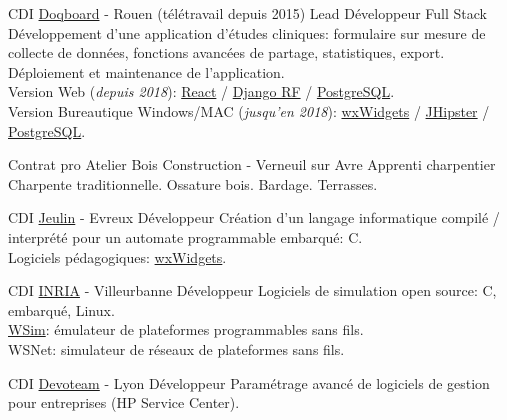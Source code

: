 \documentclass[10pt]{article} %
\begin{document}
\begin{paracol}{2}
  {CDI} %
  {\href{https://doqboard.com}{Doqboard} {\small- Rouen (télétravail depuis 2015)}} %
  {Lead Développeur Full Stack} %
  {Développement d'une application d'études cliniques: formulaire sur mesure de collecte de données, fonctions avancées de partage, statistiques, export.  Déploiement et maintenance de l'application.\\
    Version Web {\small(\textit{depuis 2018})}: \href{https://reactjs.org/}{React} / \href{https://www.django-rest-framework.org/}{Django RF} / \href{https://www.postgresql.org/}{PostgreSQL}. \\
    Version Bureautique Windows/MAC {\small(\textit{jusqu'en 2018})}: \href{https://www.wxwidgets.org/}{wxWidgets} / \href{https://www.jhipster.tech/}{JHipster} / \href{https://www.postgresql.org/}{PostgreSQL}.} %


  {Contrat pro} %
  {Atelier Bois Construction {\small- Verneuil sur Avre}} %
  {Apprenti charpentier} %
  {Charpente traditionnelle. Ossature bois. Bardage. Terrasses.}  %


  {CDI} %
  {\href{https://www.jeulin.fr/}{Jeulin} {\small- Evreux}} %
  {Développeur} %
  {Création d'un langage informatique compilé / interprété pour un automate programmable embarqué: C. \\
    Logiciels pédagogiques: \href{https://www.wxwidgets.org/}{wxWidgets}.} %

  {CDI} %
  {\href{https://www.inria.fr/}{INRIA} {\small- Villeurbanne}} %
  {Développeur} %
  {Logiciels de simulation open source: C, embarqué, Linux. \\
    \href{https://github.com/afrab/WSim}{WSim}: émulateur de plateformes programmables sans fils. \\
    WSNet: simulateur de réseaux de plateformes sans fils.} %

  {CDI} %
  {\href{https://devoteam.com/}{Devoteam} {\small- Lyon}} %
  {Développeur} %
  {Paramétrage avancé de logiciels de gestion pour entreprises (HP Service Center).} %


\end{paracol}
\end{document}
